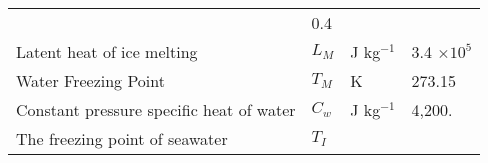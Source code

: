 \begin{longtable}[]{@{}llll@{}}
\begin{minipage}[t]{0.22\columnwidth}
\strut
\end{minipage} & \begin{minipage}[t]{0.22\columnwidth}\raggedright
0.4\strut
\end{minipage}\tabularnewline
\begin{minipage}[t]{0.22\columnwidth}\raggedright
Latent heat of ice melting\strut
\end{minipage} & \begin{minipage}[t]{0.22\columnwidth}\raggedright
\(L_M\)\strut
\end{minipage} & \begin{minipage}[t]{0.22\columnwidth}\raggedright
J kg\(^{-1}\)\strut
\end{minipage} & \begin{minipage}[t]{0.22\columnwidth}\raggedright
3.4 \(\times 10^5\)\strut
\end{minipage}\tabularnewline
\begin{minipage}[t]{0.22\columnwidth}\raggedright
Water Freezing Point\strut
\end{minipage} & \begin{minipage}[t]{0.22\columnwidth}\raggedright
\(T_M\)\strut
\end{minipage} & \begin{minipage}[t]{0.22\columnwidth}\raggedright
K\strut
\end{minipage} & \begin{minipage}[t]{0.22\columnwidth}\raggedright
273.15\strut
\end{minipage}\tabularnewline
\begin{minipage}[t]{0.22\columnwidth}\raggedright
Constant pressure specific heat of water\strut
\end{minipage} & \begin{minipage}[t]{0.22\columnwidth}\raggedright
\(C_w\)\strut
\end{minipage} & \begin{minipage}[t]{0.22\columnwidth}\raggedright
J kg\(^{-1}\)\strut
\end{minipage} & \begin{minipage}[t]{0.22\columnwidth}\raggedright
4,200.\strut
\end{minipage}\tabularnewline
\begin{minipage}[t]{0.22\columnwidth}\raggedright
The freezing point of seawater\strut
\end{minipage} & \begin{minipage}[t]{0.22\columnwidth}\raggedright
\(T_I\)\strut
\end{minipage} & \begin{minipage}[t]{0.22\columnwidth}\raggedright

\end{minipage}
\end{longtable}
